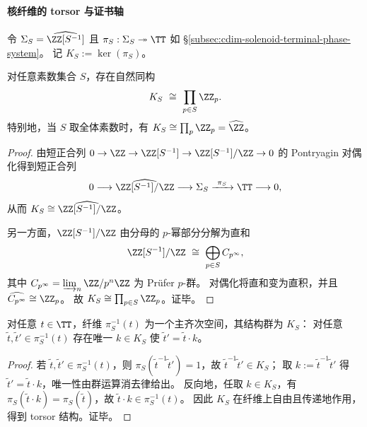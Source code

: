 \paragraph{核纤维的 torsor 与证书轴}
令 \(\Sigma_S=\widehat{\ZZ[S^{-1}]}\) 且 \(\pi_S:\Sigma_S\twoheadrightarrow \TT\) 如 \S\ref{subsec:cdim-solenoid-terminal-phase-system}。
记
\(
K_S:=\ker(\pi_S)
\)。

\begin{proposition}\label{prop:cdim-solenoid-kernel-product-zp}
对任意素数集合 \(S\)，存在自然同构
\[
K_S\ \cong\ \prod_{p\in S}\ZZ_p.
\]
特别地，当 \(S\) 取全体素数时，有 \(K_S\cong\prod_p \ZZ_p=\widehat{\ZZ}\)。
\end{proposition}
\begin{proof}
由短正合列
\(
0\to \ZZ\to \ZZ[S^{-1}]\to \ZZ[S^{-1}]/\ZZ\to 0
\)
的 Pontryagin 对偶化得到短正合列
\[
0\longrightarrow \widehat{\ZZ[S^{-1}]/\ZZ}\longrightarrow \Sigma_S\xrightarrow{\ \pi_S\ }\TT\longrightarrow 0,
\]
从而 \(K_S\cong \widehat{\ZZ[S^{-1}]/\ZZ}\)。
\par
另一方面，\(\ZZ[S^{-1}]/\ZZ\) 由分母的 \(p\)-幂部分分解为直和
\[
\ZZ[S^{-1}]/\ZZ\ \cong\ \bigoplus_{p\in S} C_{p^{\infty}},
\]
其中 \(C_{p^{\infty}}=\varinjlim_n \ZZ/p^n\ZZ\) 为 Prüfer \(p\)-群。
对偶化将直和变为直积，并且 \(\widehat{C_{p^{\infty}}}\cong \ZZ_p\)。
故
\(
K_S\cong \prod_{p\in S}\ZZ_p
\)。证毕。
\end{proof}

\begin{corollary}\label{cor:cdim-solenoid-fiber-torsor}
对任意 \(t\in\TT\)，纤维 \(\pi_S^{-1}(t)\) 为一个主齐次空间，其结构群为 \(K_S\)：
对任意 \(\tilde t,\tilde t'\in \pi_S^{-1}(t)\) 存在唯一 \(k\in K_S\) 使 \(\tilde t'=\tilde t\cdot k\)。
\end{corollary}
\begin{proof}
若 \(\tilde t,\tilde t'\in\pi_S^{-1}(t)\)，则 \(\pi_S(\tilde t^{-1}\tilde t')=1\)，故 \(\tilde t^{-1}\tilde t'\in K_S\)；
取 \(k:=\tilde t^{-1}\tilde t'\) 得 \(\tilde t'=\tilde t\cdot k\)，唯一性由群运算消去律给出。
反向地，任取 \(k\in K_S\)，有 \(\pi_S(\tilde t\cdot k)=\pi_S(\tilde t)\)，故 \(\tilde t\cdot k\in \pi_S^{-1}(t)\)。
因此 \(K_S\) 在纤维上自由且传递地作用，得到 torsor 结构。证毕。
\end{proof}

\endinput

